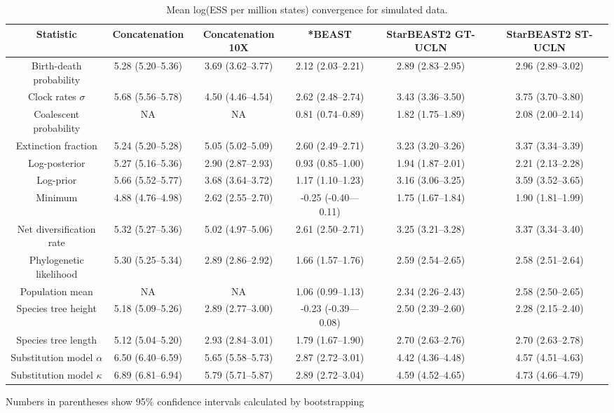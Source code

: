 \documentclass[12pt]{article}
\begin{document}
\begin{landscape}
\clearpage

\begin{table}[htb!]
\centering
\caption{Mean log(ESS per million states) convergence for simulated data.}
\label{tab:simulatedPerMstates}
\begin{threeparttable}
\begin{adjustbox}{center}
\renewcommand{\arraystretch}{1.2}
\footnotesize
\begin{tabular}{|c|c|c|c|c|c|}
\multicolumn{1}{c}{Statistic} & \multicolumn{1}{c}{Concatenation} & \multicolumn{1}{c}{Concatenation 10X} & \multicolumn{1}{c}{*BEAST} & \multicolumn{1}{c}{StarBEAST2 GT-UCLN} & \multicolumn{1}{c}{StarBEAST2 ST-UCLN}\tabularnewline
\hline
Birth-death probability & 5.28 (5.20--5.36) & 3.69 (3.62--3.77) & 2.12 (2.03--2.21) & 2.89 (2.83--2.95) & 2.96 (2.89--3.02)\tabularnewline
\hline
Clock rates $\sigma$ & 5.68 (5.56--5.78) & 4.50 (4.46--4.54) & 2.62 (2.48--2.74) & 3.43 (3.36--3.50) & 3.75 (3.70--3.80)\tabularnewline
\hline
Coalescent probability & NA & NA & 0.81 (0.74--0.89) & 1.82 (1.75--1.89) & 2.08 (2.00--2.14)\tabularnewline
\hline
Extinction fraction & 5.24 (5.20--5.28) & 5.05 (5.02--5.09) & 2.60 (2.49--2.71) & 3.23 (3.20--3.26) & 3.37 (3.34--3.39)\tabularnewline
\hline
Log-posterior & 5.27 (5.16--5.36) & 2.90 (2.87--2.93) & 0.93 (0.85--1.00) & 1.94 (1.87--2.01) & 2.21 (2.13--2.28)\tabularnewline
\hline
Log-prior & 5.66 (5.52--5.77) & 3.68 (3.64--3.72) & 1.17 (1.10--1.23) & 3.16 (3.06--3.25) & 3.59 (3.52--3.65)\tabularnewline
\hline
Minimum & 4.88 (4.76--4.98) & 2.62 (2.55--2.70) & -0.25 (-0.40---0.11) & 1.75 (1.67--1.84) & 1.90 (1.81--1.99)\tabularnewline
\hline
Net diversification rate & 5.32 (5.27--5.36) & 5.02 (4.97--5.06) & 2.61 (2.50--2.71) & 3.25 (3.21--3.28) & 3.37 (3.34--3.40)\tabularnewline
\hline
Phylogenetic likelihood & 5.30 (5.25--5.34) & 2.89 (2.86--2.92) & 1.66 (1.57--1.76) & 2.59 (2.54--2.65) & 2.58 (2.51--2.64)\tabularnewline
\hline
Population mean & NA & NA & 1.06 (0.99--1.13) & 2.34 (2.26--2.43) & 2.58 (2.50--2.65)\tabularnewline
\hline
Species tree height & 5.18 (5.09--5.26) & 2.89 (2.77--3.00) & -0.23 (-0.39---0.08) & 2.50 (2.39--2.60) & 2.28 (2.15--2.40)\tabularnewline
\hline
Species tree length & 5.12 (5.04--5.20) & 2.93 (2.84--3.01) & 1.79 (1.67--1.90) & 2.70 (2.63--2.76) & 2.70 (2.63--2.78)\tabularnewline
\hline
Substitution model $\alpha$ & 6.50 (6.40--6.59) & 5.65 (5.58--5.73) & 2.87 (2.72--3.01) & 4.42 (4.36--4.48) & 4.57 (4.51--4.63)\tabularnewline
\hline
Substitution model $\kappa$ & 6.89 (6.81--6.94) & 5.79 (5.71--5.87) & 2.89 (2.72--3.04) & 4.59 (4.52--4.65) & 4.73 (4.66--4.79)\tabularnewline
\hline
\end{tabular}
\end{adjustbox}
\begin{tablenotes}
\footnotesize
\item Numbers in parentheses show 95\% confidence intervals calculated by bootstrapping
\end{tablenotes}
\end{threeparttable}
\end{table}


\end{landscape}
\end{document}
